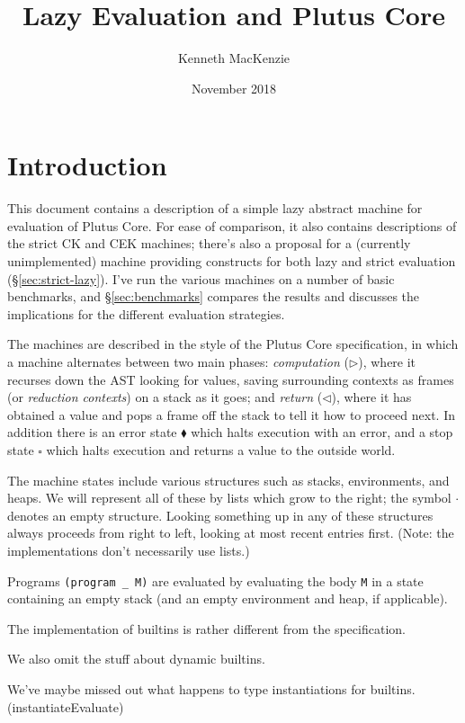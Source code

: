 \documentclass[a4paper]{article}
\author{Kenneth MacKenzie}
\date{November 2018}
\title{Lazy Evaluation and Plutus Core}
\begin{document}
\maketitle
\section{Introduction}
This document contains a description of a simple lazy abstract machine
for evaluation of Plutus Core.  For ease of comparison, it also
contains descriptions of the strict CK and CEK machines; there's also
a proposal for a (currently unimplemented) machine providing
constructs for both lazy and strict evaluation
(\S\ref{sec:strict-lazy}).  I've run the various machines on a
number of basic benchmarks, and \S\ref{sec:benchmarks} compares
the results and discusses the implications for the different
evaluation strategies.

The machines are described in the style of the Plutus Core
specification, in which a machine alternates between two main phases:
\textit{computation} ($\triangleright$), where it recurses down the
AST looking for values, saving surrounding contexts as frames
(or \textit{reduction contexts}) on a stack as it goes; and
\textit{return} ($\triangleleft$), where it has obtained a value and
pops a frame off the stack to tell it how to proceed next.  In
addition there is an error state $\blacklozenge$ which halts execution
with an error, and a stop state $\square$ which halts execution and
returns a value to the outside world.

The machine states include various structures such as stacks,
environments, and heaps.  We will represent all of these by lists
which grow to the right; the symbol $\cdot$ denotes an empty
structure.  Looking something up in any of these structures always
proceeds from right to left, looking at most recent entries first.
(Note: the implementations don't necessarily use lists.)

Programs \texttt{(program \_ M)} are evaluated by evaluating the body
\texttt{M} in a state containing an empty stack (and an empty environment
and heap, if applicable).
 
The implementation of builtins is rather different from the specification.

We also omit the stuff about dynamic builtins.

We've maybe missed out what happens to type instantiations for builtins.
(instantiateEvaluate)


\newpage
\end{document}
